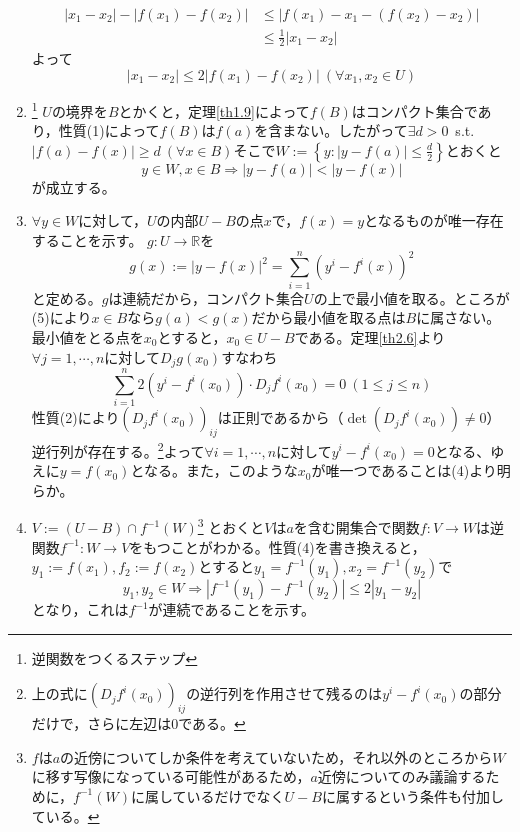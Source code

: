 \documentclass[dvipdfmx,a4j,10pt]{jsarticle}
\makeatletter
\theoremstyle{mystyle1}
\theoremstyle{mystyle2}
\renewenvironment{proof}[1][\proofname]{\par
  \pushQED{\qed}%
  \normalfont
  \topsep6\p@\@plus6\p@ \trivlist
  \item[\hskip\labelsep{\bfseries\sffamily #1}]\ignorespaces
}{%
  \popQED\endtrivlist\@endpefalse
}
\renewcommand\proofname{証明}
\makeatother
\begin{document}
\begin{proof}
\begin{enumerate}
\[\begin{split}
		|x_1-x_2|-|f(x_1)-f(x_2)|&\leq|f(x_1)-x_1-(f(x_2)-x_2)|\\
		&\leq\frac{1}{2}|x_1-x_2|
	\end{split}
	\]\footnotemark
	よって
	\begin{equation}
		|x_1-x_2|\leq2|f(x_1)-f(x_2)|\ (\forall x_1,x_2\in U)
	\end{equation}
	\item\footnote{逆関数をつくるステップ}
	$U$の境界を$B$とかくと，定理\ref{th1.9}によって$f(B)$はコンパクト集合であり，性質(1)によって$f(B)$は$f(a)$を含まない。したがって$\exists d>0$\ s.t.\ $|f(a)-f(x)|\geq d\ (\forall x\in B)$そこで$\displaystyle W:=\left\{y:|y-f(a)|\leq\frac{d}{2}\right\}$とおくと
	\begin{equation}
		y\in W,x\in B\Rightarrow |y-f(a)|<|y-f(x)|
	\end{equation}
が成立する。

	\item $\forall y\in W$に対して，$U$の内部$U-B$の点$x$で，$f(x)=y$となるものが唯一存在することを示す。
	$g:U\to\mathbb{R}$を
	\[
	g(x):=|y-f(x)|^2=\sum_{i=1}^{n}(y^i-f^i(x))^2
	\]
	と定める。$g$は連続だから，コンパクト集合$U$の上で最小値を取る。ところが(5)により$x\in B$なら$g(a)<g(x)$だから最小値を取る点は$B$に属さない。最小値をとる点を$x_0$とすると，$x_0\in U-B$である。定理\ref{th2.6}より$\forall j=1,\cdots,n$に対して$D_jg(x_0)$すなわち
	\[
	\sum_{i=1}^n 2(y^i-f^i(x_0))\cdot D_jf^i(x_0)=0\ (1\leq j\leq n)
	\]
	性質(2)により$(D_jf^i(x_0))_{ij}$は正則であるから（$\det(D_jf^i(x_0))\neq0$）逆行列が存在する。\footnote{上の式に$(D_jf^i(x_0))_{ij} $の逆行列を作用させて残るのは$y^i-f^i(x_0)$の部分だけで，さらに左辺は0である。}よって$\forall i=1,\cdots,n$に対して$y^i-f^i(x_0)=0$となる、ゆえに$y=f(x_0)$となる。また，このような$x_0$が唯一つであることは(4)より明らか。

	\item $V:=(U-B)\cap f^{-1}(W)$\footnote{$f$は$a$の近傍についてしか条件を考えていないため，それ以外のところから$W$に移す写像になっている可能性があるため，$a$近傍についてのみ議論するために，$f^{-1}(W)$に属しているだけでなく$U-B$に属するという条件も付加している。}
	とおくと$V$は$a$を含む開集合で関数$f:V\to W$は逆関数$f^{-1}:W\to V$をもつことがわかる。性質(4)を書き換えると，$y_1:=f(x_1),f_2:=f(x_2)$とすると$y_1=f^{-1}(y_1),x_2=f^{-1}(y_2)$で
	\begin{equation}
	y_1,y_2\in W\Rightarrow |f^{-1}(y_1)-f^{-1}(y_2)|\leq 2|y_1-y_2|
	\end{equation}
	となり，これは$f^{-1}$が連続であることを示す。


\end{enumerate}
\end{proof}
\end{document}
